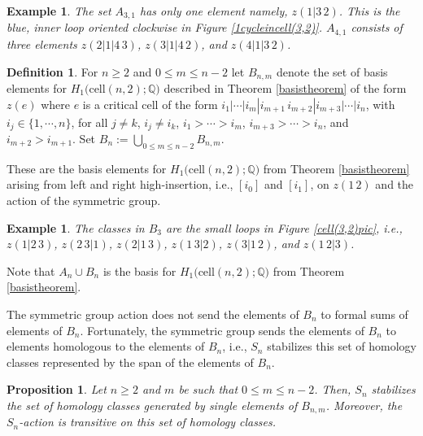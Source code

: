 \documentclass[12py]{amsart}%
\newtheorem{prop}[thm]{Proposition}
\newtheorem{exam}[thm]{Example}
\theoremstyle{definition}\newtheorem{definition}[thm]{Definition}
\theoremstyle{definition}
\newtheorem{defn}[thm]{Definition}
\newcommand{\Q}{\ensuremath{\mathbb{Q}}}
\begin{document}
\begin{exam}
The set $A_{3,1}$ has only one element namely, $z(1|3\,2)$. This is the blue, inner loop oriented clockwise in Figure \ref{1cycleincell(3,2)}. $A_{4,1}$ consists of three elements $z(2|1|4\,3)$, $z(3|1|4\,2)$, and $z(4|1|3\,2)$. 
\end{exam}

\begin{defn}
For $n\ge 2$ and $0\le m\le n-2$ let \emph{$B_{n, m}$} denote the set of basis elements for $H_{1}\big(\text{cell}(n,2);\Q\big)$ described in Theorem \ref{basistheorem} of the form $z(e)$ where $e$ is a critical cell of the form $i_{1}|\cdots|i_{m}|i_{m+1}\,i_{m+2}|i_{m+3}|\cdots|i_{n}$, with $i_{j}\in \{1,\cdots, n\}$, for all $j\neq k$, $i_{j}\neq i_{k}$, $i_{1}>\cdots>i_{m}$, $i_{m+3}>\cdots>i_{n}$, and $i_{m+2}>i_{m+1}$. Set $B_{n}:=\bigcup_{0\le m\le n-2}B_{n,m}$.
\end{defn}

These are the basis elements for $H_{1}\big(\text{cell}(n,2); \Q\big)$ from Theorem \ref{basistheorem} arising from left and right high-insertion, i.e., $[i_{0}]$ and $[i_{1}]$, on $z(1\,2)$ and the action of the symmetric group.

\begin{exam}
The classes in $B_{3}$ are the small loops in Figure \ref{cell(3,2)pic}, i.e., $z(1|2\,3)$, $z(2\,3|1)$, $z(2|1\,3)$, $z(1\,3|2)$, $z(3|1\,2)$, and $z(1\,2|3)$.
\end{exam}

Note that $A_{n}\cup B_{n}$ is the basis for $H_{1}\big(\text{cell}(n,2); \Q\big)$ from Theorem \ref{basistheorem}.

The symmetric group action does not send the elements of $B_{n}$ to formal sums of elements of $B_{n}$. Fortunately, the symmetric group sends the elements of $B_{n}$ to elements homologous to the elements of $B_{n}$, i.e., $S_{n}$ stabilizes this set of homology classes represented by the span of the elements of $B_{n}$.

\begin{prop}\label{BnmisSnhomologygood}
Let $n\ge 2$ and $m$ be such that $0\le m\le n-2$. Then, $S_{n}$ stabilizes the set of homology classes generated by single elements of $B_{n,m}$. Moreover, the $S_{n}$-action is transitive on this set of homology classes.
\end{prop}
\end{document}

